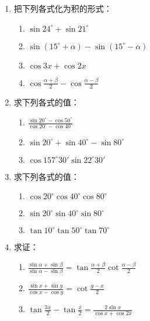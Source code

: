 \begin{enumerate}
    \item 把下列各式化为积的形式：
\begin{multicols}{2}
\begin{enumerate}[(1)]
    \item $\sin24^{\circ}+\sin21^{\circ}$
    \item $\sin(15^{\circ}+\alpha)-\sin(15^{\circ}-\alpha)$
    \item $\cos 3x+\cos 2x$
    \item $\cos\frac{\alpha+\beta}{2}-\cos\frac{\alpha-\beta}{2}$
\end{enumerate}
\end{multicols}

\item 求下列各式的值：
\begin{multicols}{2}
\begin{enumerate}[(1)]
    \item $\frac{\sin20^{\circ}-\cos 50^{\circ}}{\cos 20^{\circ}-\cos 40^{\circ}}$
    \item $\sin 20^{\circ}+\sin 40^{\circ}-\sin 80^{\circ}$
    \item $\cos157^{\circ}30'\sin 22^{\circ}30'$
\end{enumerate}
\end{multicols}

\item 求下列各式的值：
\begin{multicols}{2}
\begin{enumerate}[(1)]
    \item $\cos 20^{\circ}\cos 40^{\circ}\cos 80^{\circ}$
    \item $\sin 20^{\circ}\sin 40^{\circ}\sin 80^{\circ}$
    \item $\tan10^{\circ}\tan 50^{\circ}\tan 70^{\circ}$
\end{enumerate}
\end{multicols}

\item 求证：

\begin{enumerate}[(1)]
    \item $\frac{\sin\alpha+\sin\beta}{\sin\alpha-\sin\beta}=\tan\frac{\alpha+\beta}{2}\cot\frac{\alpha-\beta}{2}$
    \item $\frac{\sin x+\sin y}{\cos x-\cos y}=\cot\frac{y-x}{2}$
    \item $\tan\frac{3x}{2}-\tan\frac{x}{2}=\frac{2\sin x}{\cos x+\cos 2x}$
\end{enumerate}


\end{enumerate}
